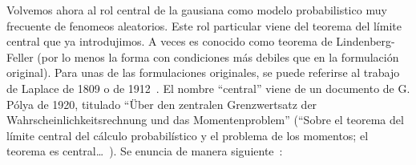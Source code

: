 Volvemos  ahora al rol  central de  la gausiana  como modelo  probabilistico muy
frecuente  de fenomeos  aleatorios. Este  rol particular  viene del  teorema del
l\'imite  central que  ya  introdujimos. A  veces  es conocido  como teorema  de
Lindenberg-Feller (por lo menos la forma con condiciones m\'as debiles que en la
formulaci\'on original).   Para unas de  las formulaciones originales,  se puede
referirse  al trabajo  de Laplace  de  1809 o  de 1912~\cite{Lap09,  Lap09:Supp,
  Lap12,  Lap14,  Lap20}.   El  nombre  ``central'' viene  de  un  documento  de
G.  P\'olya   de  1920,  titulado  ``\"Uber  den   zentralen  Grenzwertsatz  der
Wahrscheinlichkeitsrechnung  und das Momentenproblem''  (``Sobre el  teorema del
l\'imite central del  c\'alculo probabil\'istico y el problema  de los momentos;
el  teorema  es  central\ldots~\cite{Pol20,   Cam86}).   Se  enuncia  de  manera
siguiente~\cite{Spi76, BroDav87, AshDol99, JacPro03, AthLah06, Bil12}:

